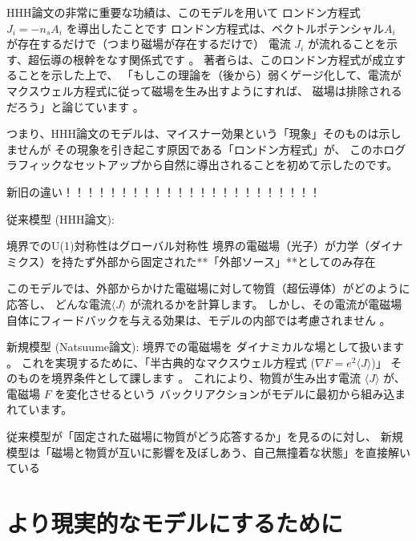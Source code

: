 \documentclass[b5paper,11pt,dvipdfmx]{jsarticle}
\numberwithin{equation}{section}
\theoremstyle{definition}
\begin{document}
HHH論文の非常に重要な功績は、このモデルを用いて
ロンドン方程式 $J_i = -n_s A_i$ を導出したことです
ロンドン方程式は、ベクトルポテンシャル$A_i$ が存在するだけで（つまり磁場が存在するだけで）
電流 $J_i$ が流れることを示す、超伝導の根幹をなす関係式です 。
著者らは、このロンドン方程式が成立することを示した上で、
「もしこの理論を（後から）弱くゲージ化して、電流がマクスウェル方程式に従って磁場を生み出すようにすれば、
磁場は排除されるだろう」と論じています 。

つまり、HHH論文のモデルは、マイスナー効果という「現象」そのものは示しませんが
その現象を引き起こす原因である「ロンドン方程式」が、
このホログラフィックなセットアップから自然に導出されることを初めて示したのです。










新旧の違い！！！！！！！！！！！！！！！！！！！！！！！

従来模型 (HHH論文):

境界でのU(1)対称性はグローバル対称性
境界の電磁場（光子）が力学（ダイナミクス）を持たず外部から固定された**「外部ソース」**としてのみ存在

このモデルでは、外部からかけた電磁場に対して物質（超伝導体）がどのように応答し、
どんな電流$\langle J \rangle$ が流れるかを計算します。
しかし、その電流が電磁場自体にフィードバックを与える効果は、モデルの内部では考慮されません 。

新規模型 (Natsuume論文):
境界での電磁場を
ダイナミカルな場として扱います 。
これを実現するために、「半古典的なマクスウェル方程式 ($\nabla F = e^2 \langle J \rangle$)」
そのものを境界条件として課します 。
これにより、物質が生み出す電流 $\langle J \rangle$ が、電磁場 $F$ を変化させるという
バックリアクションがモデルに最初から組み込まれています。

従来模型が「固定された磁場に物質がどう応答するか」を見るのに対し、
新規模型は「磁場と物質が互いに影響を及ぼしあう、自己無撞着な状態」を直接解いている













\section{より現実的なモデルにするために}
\end{document}
